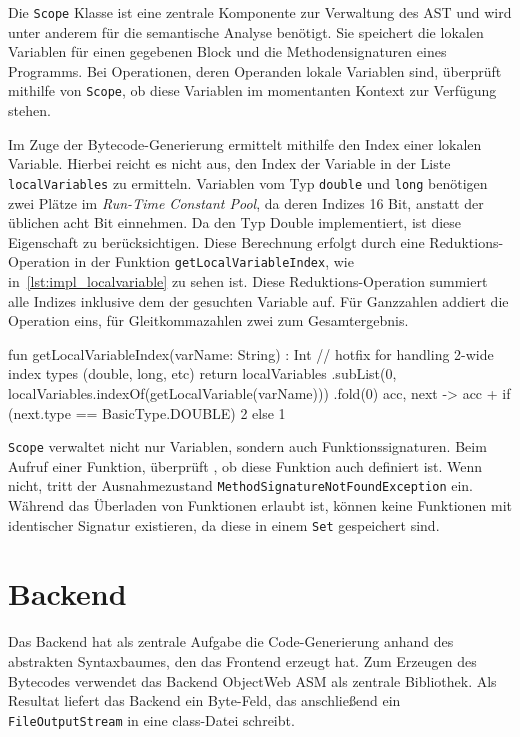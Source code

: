 Die \texttt{Scope} Klasse ist eine zentrale Komponente zur Verwaltung des AST und wird unter anderem für die semantische Analyse benötigt. Sie speichert die lokalen Variablen für einen gegebenen Block und die Methodensignaturen eines \toya Programms. Bei Operationen, deren Operanden lokale Variablen sind, überprüft \toya mithilfe von \texttt{Scope}, ob diese Variablen im momentanten Kontext zur Verfügung stehen.

Im Zuge der Bytecode-Generierung ermittelt \toya mithilfe \scope den Index einer lokalen Variable. Hierbei reicht es nicht aus, den Index der Variable in der Liste \texttt{localVariables} zu ermitteln. Variablen vom Typ \texttt{double} und \texttt{long} benötigen zwei Plätze im \textit{Run-Time Constant Pool}, da deren Indizes 16 Bit, anstatt der üblichen acht Bit einnehmen. Da \toya den Typ Double implementiert, ist diese Eigenschaft zu berücksichtigen. Diese Berechnung erfolgt durch eine Reduktions-Operation in der Funktion \texttt{getLocalVariableIndex}, wie in~\autoref{lst:impl_localvariable} zu sehen ist. Diese Reduktions-Operation summiert alle Indizes inklusive dem der gesuchten Variable auf. Für Ganzzahlen addiert die Operation eins, für Gleitkommazahlen zwei zum Gesamtergebnis.

\begin{KotlinCode}[numbers=none, caption={Ermittlung des Index einer Variable in einem \texttt{Scope}}, label=lst:impl_localvariable]
fun getLocalVariableIndex(varName: String) : Int {
    // hotfix for handling 2-wide index types (double, long, etc)
    return localVariables
        .subList(0, localVariables.indexOf(getLocalVariable(varName)))
        .fold(0) { acc, next ->
            acc + if (next.type == BasicType.DOUBLE) 2 else 1
        }
}
\end{KotlinCode}

\texttt{Scope} verwaltet nicht nur Variablen, sondern auch Funktionssignaturen. Beim Aufruf einer Funktion, überprüft \scope, ob diese Funktion auch definiert ist. Wenn nicht, tritt der Ausnahmezustand \texttt{MethodSignatureNotFoundException} ein. Während das Überladen von Funktionen erlaubt ist, können keine Funktionen mit identischer Signatur existieren, da diese in einem \texttt{Set} gespeichert sind.

\section{Backend}

Das Backend hat als zentrale Aufgabe die Code-Generierung anhand des abstrakten Syntaxbaumes, den das Frontend erzeugt hat. Zum Erzeugen des Bytecodes verwendet das Backend ObjectWeb ASM als zentrale Bibliothek. Als Resultat liefert das Backend ein Byte-Feld, das anschließend ein \texttt{FileOutputStream} in eine class-Datei schreibt.


